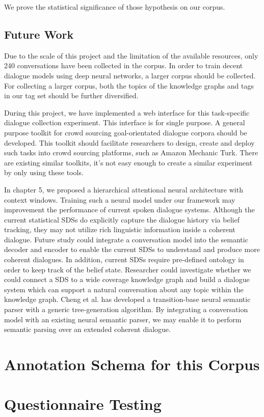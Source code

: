 \documentclass[bsc,frontabs,twoside,singlespacing,parskip,deptreport]{infthesis}     %
\begin{document}
We prove the statistical significance of those hypothesis on our corpus.

\section{Future Work}

Due to the scale of this project and the limitation of the available resources, only 240 conversations have been collected in the corpus. In order to train decent dialogue models using deep neural networks, a larger corpus should be collected. For collecting a larger corpus, both the topics of the knowledge graphs and tags in our tag set should be further diversified.

During this project, we have implemented a web interface for this task-specific dialogue collection experiment. This interface is for single purpose. A general purpose toolkit for crowd sourcing goal-orientated dialogue corpora should be developed. This toolkit should facilitate researchers to design, create and deploy such tasks into crowd sourcing platforms, such as Amazon Mechanic Turk\cite{mturk}. There are existing similar toolkits\cite{lee2018dialcrowd,miller2017parlai}, it's not easy enough to create a similar experiment by only using these tools.

In chapter 5, we proposed a hierarchical attentional neural architecture with context windows. Training such a neural model under our framework may improvement the performance of current spoken dialogue systems. Although the current statistical SDSs do explicitly capture the dialogue history via belief tracking, they may not utilize rich linguistic information inside a coherent dialogue\cite{gasic}. Future study could integrate a conversation model into the semantic decoder and encoder to enable the current SDSs to understand and produce more coherent dialogues. In addition, current SDSs require pre-defined ontology in order to keep track of the belief state. Researcher could investigate whether we could connect a SDS to a wide coverage knowledge graph and build a dialogue system which can support a natural conversation about any topic within the knowledge graph. Cheng et al.\cite{cheng2019learning} has developed a transition-base neural semantic parser with a generic tree-generation algorithm. By integrating a conversation model with an existing neural semantic parser, we may enable it to perform semantic parsing over an extended coherent dialogue.






\appendix
\chapter{Annotation Schema for this Corpus}


\label{appendix:annotation}

\chapter{Questionnaire Testing}
\end{document}

